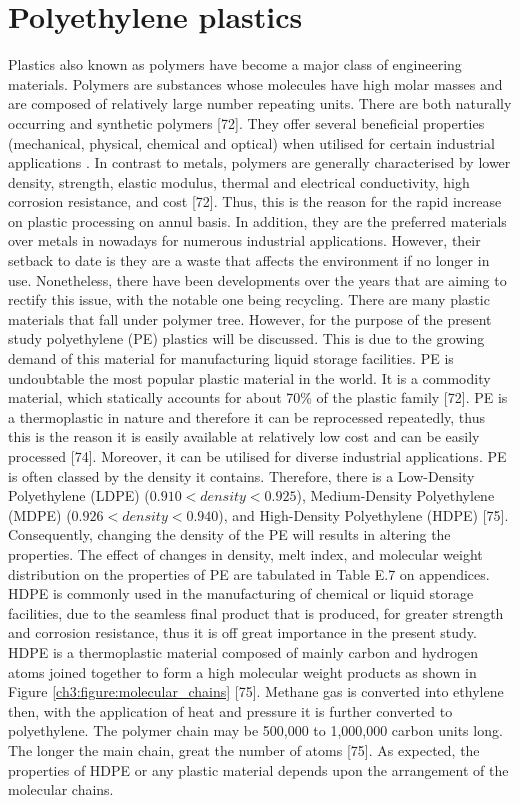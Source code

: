 \documentclass[12pt]{report}
\begin{document}
\section{Polyethylene plastics}
Plastics also known as polymers have become a major class of engineering materials. Polymers are substances whose molecules have high molar masses and are composed of relatively large number repeating units. There are both naturally occurring and synthetic polymers [72]. They offer several beneficial properties (mechanical, physical, chemical and optical) when utilised for certain industrial applications \cite{nugent2017rotational}. In contrast to metals, polymers are generally characterised by lower density, strength, elastic modulus, thermal and electrical conductivity, high corrosion resistance, and cost [72]. Thus, this is the reason for the rapid increase on plastic processing on annul basis. In addition, they are the preferred materials over metals in nowadays for numerous industrial applications. However, their setback to date is they are a waste that affects the environment if no longer in use. Nonetheless, there have been developments over the years that are aiming to rectify this issue, with the notable one being recycling.  
There are many plastic materials that fall under polymer tree. However, for the purpose of the present study polyethylene (PE) plastics will be discussed. This is due to the growing demand of this material for manufacturing liquid storage facilities. PE is undoubtable the most popular plastic material in the world. It is a commodity material, which statically accounts for about 70\% of the plastic family [72].  PE is a thermoplastic in nature and therefore it can be reprocessed repeatedly, thus this is the reason it is easily available at relatively low cost and can be easily processed [74]. Moreover, it can be utilised for diverse industrial applications. 
PE is often classed by the density it contains. Therefore, there is a Low-Density Polyethylene (LDPE) ($0.910 < density < 0.925$), Medium-Density Polyethylene (MDPE) ($0.926 < density < 0.940$), and High-Density Polyethylene (HDPE) [75]. Consequently, changing the density of the PE will results in altering the properties. The effect of changes in density, melt index, and molecular weight distribution on the properties of PE are tabulated in Table E.7 on appendices. 
HDPE is commonly used in the manufacturing of chemical or liquid storage facilities, due to the seamless final product that is produced, for greater strength and corrosion resistance, thus it is off great importance in the present study. HDPE is a thermoplastic material composed of mainly carbon and hydrogen atoms joined together to form a high molecular weight products as shown in Figure \ref{ch3:figure:molecular_chains} [75]. Methane gas is converted into ethylene then, with the application of heat and pressure it is further converted to polyethylene. The polymer chain may be 500,000 to 1,000,000 carbon units long. The longer the main chain, great the number of atoms [75]. As expected, the properties of HDPE or any plastic material depends upon the arrangement of the molecular chains. 
               
\end{document}
